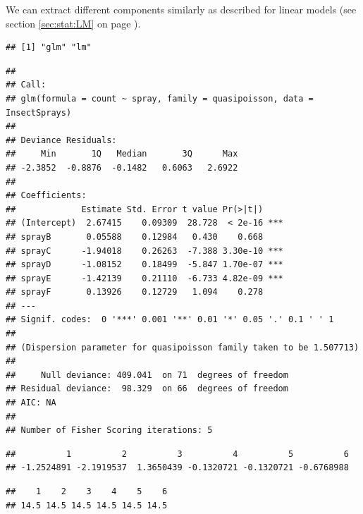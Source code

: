 \documentclass[krantz2]{krantz}\usepackage{knitr}
\begin{document}
We can extract different components similarly as described for linear models (see section \ref{sec:stat:LM} on page \pageref{sec:stat:LM}).

\begin{knitrout}\footnotesize
{}\color{fgcolor}\begin{kframe}
\begin{alltt}
\end{alltt}
\begin{verbatim}
## [1] "glm" "lm"
\end{verbatim}
\begin{alltt}
\end{alltt}
\begin{verbatim}
##
## Call:
## glm(formula = count ~ spray, family = quasipoisson, data = InsectSprays)
##
## Deviance Residuals:
##     Min       1Q   Median       3Q      Max
## -2.3852  -0.8876  -0.1482   0.6063   2.6922
##
## Coefficients:
##             Estimate Std. Error t value Pr(>|t|)
## (Intercept)  2.67415    0.09309  28.728  < 2e-16 ***
## sprayB       0.05588    0.12984   0.430    0.668
## sprayC      -1.94018    0.26263  -7.388 3.30e-10 ***
## sprayD      -1.08152    0.18499  -5.847 1.70e-07 ***
## sprayE      -1.42139    0.21110  -6.733 4.82e-09 ***
## sprayF       0.13926    0.12729   1.094    0.278
## ---
## Signif. codes:  0 '***' 0.001 '**' 0.01 '*' 0.05 '.' 0.1 ' ' 1
##
## (Dispersion parameter for quasipoisson family taken to be 1.507713)
##
##     Null deviance: 409.041  on 71  degrees of freedom
## Residual deviance:  98.329  on 66  degrees of freedom
## AIC: NA
##
## Number of Fisher Scoring iterations: 5
\end{verbatim}
\begin{alltt}
\hlstd{(}
\end{alltt}
\begin{verbatim}
##          1          2          3          4          5          6
## -1.2524891 -2.1919537  1.3650439 -0.1320721 -0.1320721 -0.6768988
\end{verbatim}
\begin{alltt}
\hlstd{(}
\end{alltt}
\begin{verbatim}
##    1    2    3    4    5    6
## 14.5 14.5 14.5 14.5 14.5 14.5
\end{verbatim}
\end{kframe}
\end{knitrout}
\end{document}
